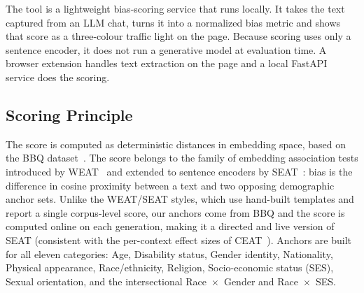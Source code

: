 \documentclass[runningheads]{llncs}
\begin{document}
The tool is a lightweight bias-scoring service that runs locally. It takes the text captured from an LLM chat, turns it into a normalized bias metric and shows that score as a three-colour traffic light on the page. Because scoring uses only a sentence encoder, it does not run a generative model at evaluation time. A browser extension handles text extraction on the page and a local FastAPI service does the scoring.

\subsection{Scoring Principle}

The score is computed as deterministic distances in embedding space, based on the BBQ dataset~\cite{parrish-etal-2022-bbq}. The score belongs to the family of embedding association tests introduced by WEAT~\cite{caliskan2017} and extended to sentence encoders by SEAT~\cite{may2019}: bias is the difference in cosine proximity between a text and two opposing demographic anchor sets. Unlike the WEAT/SEAT styles, which use hand-built templates and report a single corpus-level score, our anchors come from BBQ and the score is computed online on each generation, making it a directed and live version of SEAT (consistent with the per-context effect sizes of
CEAT~\cite{guo2021ceat}). Anchors are built for all eleven categories: Age, Disability status, Gender identity, Nationality, Physical appearance, Race/ethnicity, Religion, Socio-economic status (SES), Sexual orientation, and the intersectional Race~$\times$~Gender and Race~$\times$~SES.
\end{document}
